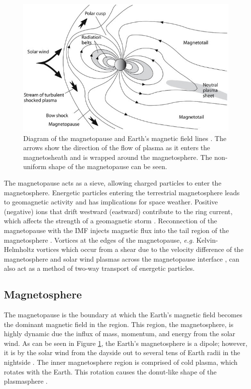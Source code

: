 \begin{figure}
    \centering
    \includegraphics[width=\linewidth]{Figures/The-magnetosphere-is-the-region-where-Earths-magnetic-field-predominates-The_W640.jpg}
    \caption[Diagram of the Earth's magnetopause and magnetic field lines.]{Diagram of the magnetopause and Earth's magnetic field lines \citep{Anderson:2018}. The arrows show the direction of the flow of plasma as it enters the magnetosheath and is wrapped around the magnetosphere. The non-uniform shape of the magnetopause can be seen.}
    \label{fig:magnetopause}
\end{figure}

The magnetopause acts as a sieve, allowing charged particles to enter the magnetosphere. Energetic particles entering the terrestrial magnetosphere leads to geomagnetic activity and has implications for space weather. Positive (negative) ions that drift westward (eastward) contribute to the ring current, which affects the strength of a geomagnetic storm \citep{Williams:1981}. Reconnection of the magnetopause with the IMF injects magnetic flux into the tail region of the magnetosphere \citep{Tsurutani:1990}. Vortices at the edges of the magnetopause, \textit{e.g.} Kelvin-Helmholtz vortices which occur from a shear due to the velocity difference of the magnetosphere and solar wind plasmas across the magnetopause interface \citep{Nykyri:2001}, can also act as a method of two-way transport of energetic particles.

\subsection{Magnetosphere}
The magnetopause is the boundary at which the Earth's magnetic field becomes the dominant magnetic field in the region. This region, the magnetosphere, is highly dynamic due the influx of mass, momentum, and energy from the solar wind. As can be seen in Figure \ref{fig:magnetopause}, the Earth's magnetosphere is a dipole; however, it is by the solar wind from the dayside out to several tens of Earth radii in the nightside \citep{Borovsky:2018}. The inner magnetosphere region is comprised of cold plasma, which rotates with the Earth. This rotation causes the donut-like shape of the plasmasphere \citep{Borovsky:2018}. 

